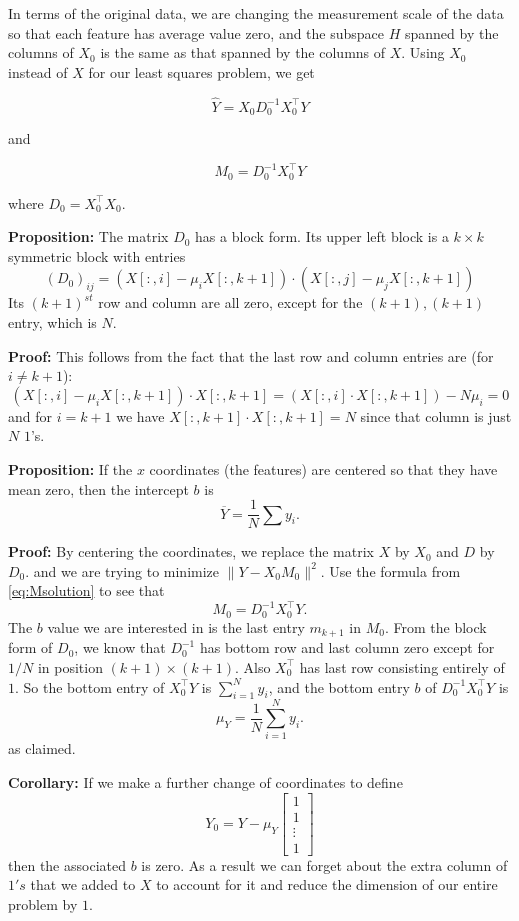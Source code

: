 \documentclass[]{article}
\begin{document}
In terms of the original data, we are changing the measurement scale of
the data so that each feature has average value zero, and the subspace
\(H\) spanned by the columns of \(X_{0}\) is the same as that spanned by
the columns of \(X\). Using \(X_{0}\) instead of \(X\) for our least
squares problem, we get

\[
\hat{Y} = X_{0}D_{0}^{-1}X_{0}^{\intercal}Y
\]

and

\[
M_{0} = D_{0}^{-1}X_{0}^{\intercal}Y
\]

where \(D_{0}=X_{0}^{\intercal}X_{0}.\)

\textbf{Proposition:} The matrix \(D_{0}\) has a block form. Its upper
left block is a \(k\times k\) symmetric block with entries \[
(D_{0})_{ij} = (X[:,i]-\mu_{i}X[:,k+1])\cdot(X[:,j]-\mu_{j}X[:,k+1])
\] Its \((k+1)^{st}\) row and column are all zero, except for the
\((k+1),(k+1)\) entry, which is \(N\).

\textbf{Proof:} This follows from the fact that the last row and column
entries are (for \(i\not=k+1\)): \[
(X[:,i]-\mu_{i}X[:,k+1])\cdot X[:,k+1] = (X[:,i]\cdot X[:,k+1])-N\mu_{i} = 0
\] and for \(i=k+1\) we have \(X[:,k+1]\cdot X[:,k+1]=N\) since that
column is just \(N\) \(1\)'s.

\textbf{Proposition:} If the \(x\) coordinates (the features) are
centered so that they have mean zero, then the intercept \(b\) is \[
\overline{Y} = \frac{1}{N}\sum y_{i}.
\]

\textbf{Proof:} By centering the coordinates, we replace the matrix
\(X\) by \(X_{0}\) and \(D\) by \(D_{0}\). and we are trying to minimize
\(\|Y-X_{0}M_{0}\|^2\). Use the formula from \cref{eq:Msolution} to see
that \[
M_{0} = D_{0}^{-1}X_{0}^{\intercal}Y.
\] The \(b\) value we are interested in is the last entry \(m_{k+1}\) in
\(M_{0}\). From the block form of \(D_{0}\), we know that \(D_{0}^{-1}\)
has bottom row and last column zero except for \(1/N\) in position
\((k+1)\times(k+1)\). Also \(X_{0}^{\intercal}\) has last row consisting
entirely of \(1\). So the bottom entry of \(X_{0}^{\intercal}Y\) is
\(\sum_{i=1}^{N} y_{i}\), and the bottom entry \(b\) of
\(D_{0}^{-1}X_{0}^{\intercal}Y\) is \[
\mu_{Y} = \frac{1}{N}\sum_{i=1}^{N} y_{i}. 
\] as claimed.

\textbf{Corollary:} If we make a further change of coordinates to define
\[
Y_{0} = Y - \mu_{Y}\left[\begin{matrix} 1 \\ 1 \\ \vdots \\ 1\end{matrix}\right]
\] then the associated \(b\) is zero. As a result we can forget about
the extra column of \(1's\) that we added to \(X\) to account for it and
reduce the dimension of our entire problem by \(1\).
\end{document}
